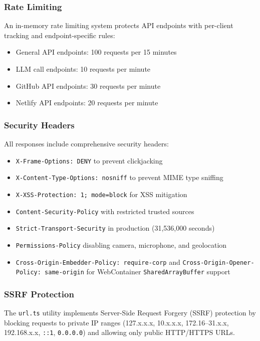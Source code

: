 \documentclass[12pt,a4paper,openany]{report}
\begin{document}
\subsubsection{Rate Limiting}
An in-memory rate limiting system protects API endpoints with per-client tracking and endpoint-specific rules:
\begin{itemize}
    \item General API endpoints: 100 requests per 15 minutes
    \item LLM call endpoints: 10 requests per minute
    \item GitHub API endpoints: 30 requests per minute
    \item Netlify API endpoints: 20 requests per minute
\end{itemize}

\subsubsection{Security Headers}
All responses include comprehensive security headers:
\begin{itemize}
    \item \texttt{X-Frame-Options: DENY} to prevent clickjacking
    \item \texttt{X-Content-Type-Options: nosniff} to prevent MIME type sniffing
    \item \texttt{X-XSS-Protection: 1; mode=block} for XSS mitigation
    \item \texttt{Content-Security-Policy} with restricted trusted sources
    \item \texttt{Strict-Transport-Security} in production (31,536,000 seconds)
    \item \texttt{Permissions-Policy} disabling camera, microphone, and geolocation
    \item \texttt{Cross-Origin-Embedder-Policy: require-corp} and \texttt{Cross-Origin-Opener-Policy: same-origin} for WebContainer \texttt{SharedArrayBuffer} support
\end{itemize}

\subsubsection{SSRF Protection}
The \texttt{url.ts} utility implements Server-Side Request Forgery (SSRF) protection by blocking requests to private IP ranges (127.x.x.x, 10.x.x.x, 172.16--31.x.x, 192.168.x.x, \texttt{::1}, \texttt{0.0.0.0}) and allowing only public HTTP/HTTPS URLs.
\end{document}
